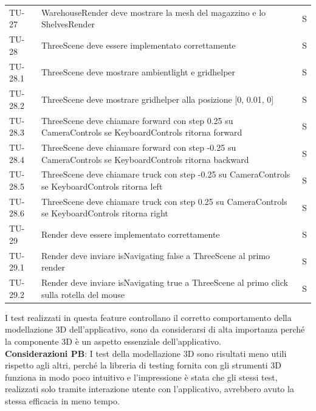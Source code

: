 \begin{xltabular}{0.9\textwidth}{X | p{0.6\textwidth} | p{0.1\textwidth} }
    TU-27 & WarehouseRender deve mostrare la mesh del magazzino e lo ShelvesRender & S\\

    TU-28 & ThreeScene deve essere implementato correttamente & S\\
    TU-28.1 & ThreeScene deve mostrare ambientlight e gridhelper & S\\
    TU-28.2 & ThreeScene deve mostrare gridhelper alla posizione [0, 0.01, 0] & S\\
    TU-28.3 & ThreeScene deve chiamare forward con step 0.25 su CameraControls se KeyboardControls ritorna forward & S\\
    TU-28.4 & ThreeScene deve chiamare forward con step -0.25 su CameraControls se KeyboardControls ritorna backward & S\\
    TU-28.5 & ThreeScene deve chiamare truck con step -0.25 su CameraControls se KeyboardControls ritorna left & S\\
    TU-28.6 & ThreeScene deve chiamare truck con step 0.25 su CameraControls se KeyboardControls ritorna right & S\\

    TU-29 & Render deve essere implementato correttamente & S\\
    TU-29.1 & Render deve inviare isNavigating false a ThreeScene al primo render & S\\
    TU-29.2 & Render deve inviare isNavigating true a ThreeScene al primo click sulla rotella del mouse & S\\

\end{xltabular}

\noindent I test realizzati in questa feature controllano il corretto comportamento della modellazione 3D dell'applicativo, sono da considerarsi di alta importanza perché la componente 3D è un aspetto essenziale dell'applicativo.
\vspace{0.2cm} \\ \textbf{Considerazioni PB}: I test della modellazione 3D sono risultati meno utili rispetto agli altri, perché la libreria di testing fornita con gli strumenti 3D funziona in modo poco intuitivo e l'impressione è stata che gli stessi test, realizzati solo tramite interazione utente con l'applicativo, avrebbero avuto la stessa efficacia in meno tempo.    


